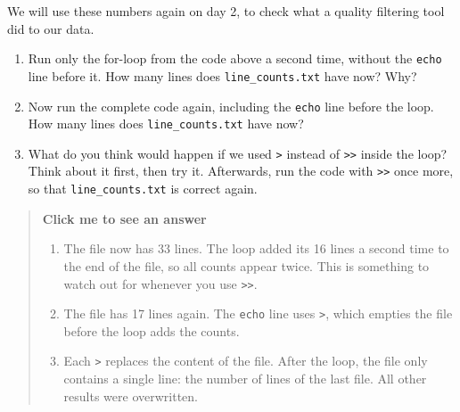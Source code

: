 \documentclass[
  letterpaper,
  DIV=11,
  numbers=noendperiod]{scrreprt}
\providecommand{\tightlist}{%
  \setlength{\itemsep}{0pt}\setlength{\parskip}{0pt}}
\begin{document}
We will use these numbers again on day 2, to check what a quality
filtering tool did to our data.

\begin{tcolorbox}[enhanced jigsaw, coltitle=black, breakable, titlerule=0mm, colback=white, rightrule=.15mm, bottomrule=.15mm, toprule=.15mm, colframe=quarto-callout-color-frame, colbacktitle=quarto-callout-color!10!white, bottomtitle=1mm, opacitybacktitle=0.6, toptitle=1mm, leftrule=.75mm, arc=.35mm, title=\textcolor{quarto-callout-color}{\faInfo}\hspace{0.5em}{Exercise}, left=2mm, opacityback=0]

\begin{enumerate}
\def\labelenumi{\arabic{enumi}.}
\tightlist
\item
  Run only the for-loop from the code above a second time, without the
  \texttt{echo} line before it. How many lines does
  \texttt{line\_counts.txt} have now? Why?
\item
  Now run the complete code again, including the \texttt{echo} line
  before the loop. How many lines does \texttt{line\_counts.txt} have
  now?
\item
  What do you think would happen if we used \texttt{\textgreater{}}
  instead of \texttt{\textgreater{}\textgreater{}} inside the loop?
  Think about it first, then try it. Afterwards, run the code with
  \texttt{\textgreater{}\textgreater{}} once more, so that
  \texttt{line\_counts.txt} is correct again.
\end{enumerate}

\begin{quote}
\textbf{Click me to see an answer}

\begin{enumerate}
\def\labelenumi{\arabic{enumi}.}
\tightlist
\item
  The file now has 33 lines. The loop added its 16 lines a second time
  to the end of the file, so all counts appear twice. This is something
  to watch out for whenever you use
  \texttt{\textgreater{}\textgreater{}}.
\item
  The file has 17 lines again. The \texttt{echo} line uses
  \texttt{\textgreater{}}, which empties the file before the loop adds
  the counts.
\item
  Each \texttt{\textgreater{}} replaces the content of the file. After
  the loop, the file only contains a single line: the number of lines of
  the last file. All other results were overwritten.
\end{enumerate}
\end{quote}

\end{tcolorbox}
\end{document}
